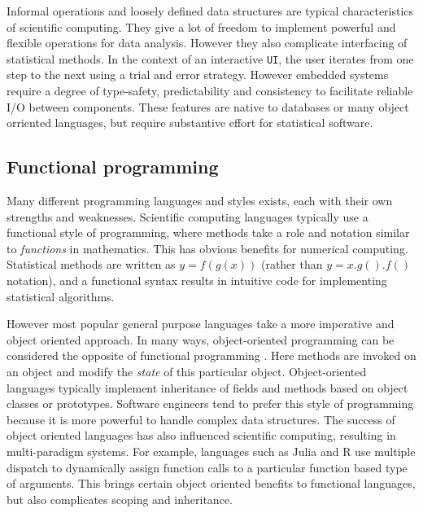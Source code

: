 \documentclass{article}
\newcommand{\UI}{\texttt{UI}\xspace}
\begin{document}
Informal operations and loosely defined data structures are typical characteristics of scientific computing. They give a lot of freedom to implement powerful and flexible operations for data analysis. However they also complicate interfacing of statistical methods. In the context of an interactive \UI, the user iterates from one step to the next using a trial and error strategy. However embedded systems require a degree of type-safety, predictability and consistency to facilitate reliable I/O between components. These features are native to databases or many object orriented languages, but require substantive effort for statistical software. 


\subsection{Functional programming}

Many different programming languages and styles exists, each with their own strengths and weaknesses. Scientific computing languages typically use a functional style of programming, where methods take a role and notation similar to \emph{functions} in mathematics. This has obvious benefits for numerical computing. Statistical methods are written as $y = f(g(x))$ (rather than $y = x.g().f()$ notation), and a functional syntax results in intuitive code for implementing statistical algorithms. 

However most popular general purpose languages take a more imperative and object oriented approach. In many ways, object-oriented programming can be considered the opposite of functional programming \citep{pythonfunctional}. Here methods are invoked on an object and modify the \emph{state} of this particular object. Object-oriented languages typically implement inheritance of fields and methods based on object classes or prototypes. Software engineers tend to prefer this style of programming because it is more powerful to handle complex data structures. The success of object oriented languages has also influenced scientific computing, resulting in multi-paradigm systems. For example, languages such as Julia and R use multiple dispatch to dynamically assign function calls to a particular function based type of arguments. This brings certain object oriented benefits to functional languages, but also complicates scoping and inheritance. 
\end{document}
